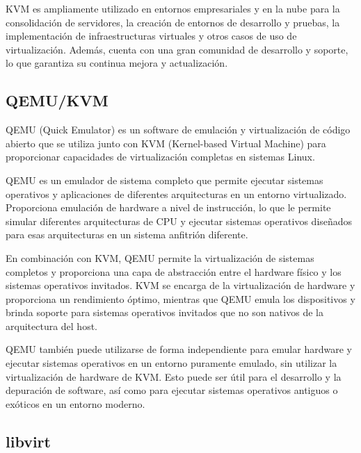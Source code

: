 				KVM es ampliamente utilizado en entornos empresariales y en la nube para la consolidación de servidores, la creación de entornos de desarrollo y pruebas, la implementación de infraestructuras virtuales y otros casos de uso de virtualización. Además, cuenta con una gran comunidad de desarrollo y soporte, lo que garantiza su continua mejora y actualización.\par
				
		
			\subsection{QEMU/KVM}
		
				QEMU (Quick Emulator) es un software de emulación y virtualización de código abierto que se utiliza junto con KVM (Kernel-based Virtual Machine) para proporcionar capacidades de virtualización completas en sistemas Linux.\par
		
				QEMU es un emulador de sistema completo que permite ejecutar sistemas operativos y aplicaciones de diferentes arquitecturas en un entorno virtualizado. Proporciona emulación de hardware a nivel de instrucción, lo que le permite simular diferentes arquitecturas de CPU y ejecutar sistemas operativos diseñados para esas arquitecturas en un sistema anfitrión diferente.\par
		
				En combinación con KVM, QEMU permite la virtualización de sistemas completos y proporciona una capa de abstracción entre el hardware físico y los sistemas operativos invitados. KVM se encarga de la virtualización de hardware y proporciona un rendimiento óptimo, mientras que QEMU emula los dispositivos y brinda soporte para sistemas operativos invitados que no son nativos de la arquitectura del host.\par
		
				QEMU también puede utilizarse de forma independiente para emular hardware y ejecutar sistemas operativos en un entorno puramente emulado, sin utilizar la virtualización de hardware de KVM. Esto puede ser útil para el desarrollo y la depuración de software, así como para ejecutar sistemas operativos antiguos o exóticos en un entorno moderno.\par
				
				
			\subsection{libvirt} 
		
